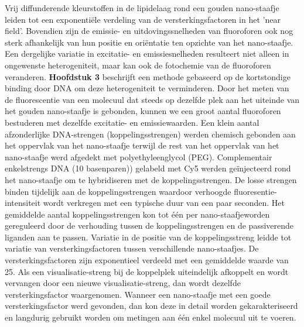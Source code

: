 Vrij diffunderende kleurstoffen in de lipidelaag rond een gouden nano-staafje leiden tot een exponentiële verdeling van de versterkingsfactoren in het ’near field’. Bovendien zijn de emissie- en uitdovingssnelheden van fluoroforen ook nog sterk afhankelijk van hun positie en oriëntatie ten opzichte van het nano-staafje. Een dergelijke variatie in excitatie- en emissiesnelheden resulteert niet alleen in ongewenste heterogeniteit, maar kan ook de fotochemie van de fluoroforen veranderen. \textbf{Hoofdstuk 3} beschrijft  een methode gebaseerd op de kortstondige binding door DNA om deze heterogeniteit te verminderen. Door het meten van de fluorescentie van een molecuul dat steeds op dezelfde plek aan het uiteinde van het gouden nano-staafje is gebonden, kunnen we een groot aantal fluoroforen bestuderen met dezelfde excitatie- en emissiewaarden. Een klein aantal afzonderlijke DNA-strengen (koppelingsstrengen) werden chemisch gebonden aan het oppervlak van het nano-staafje terwijl de rest van het oppervlak van het nano-staafje werd afgedekt met polyethyleenglycol (PEG). Complementair enkelstrengs DNA (10 basenparen)) gelabeld met Cy5 werden geïnjecteerd rond het nano-staafje om te hybridiseren met de koppelingsstrengen. De losse strengen binden tijdelijk aan de koppelingsstrengen waardoor verhoogde fluoresentie-intensiteit wordt verkregen met een typische duur van een paar seconden. Het gemiddelde aantal koppelingsstrengen kon tot één per nano-staafjeworden gereguleerd door de verhouding tussen de koppelingsstrengen en de passiverende liganden aan te passen. Variatie in de positie van de koppelingsstreng leidde tot variatie van versterkingsfactoren tussen verschillende nano-staafjes. De versterkingsfactoren zijn exponentieel verdeeld met een gemiddelde waarde van 25. Als een visualisatie-streng bij de koppelplek uiteindelijk afkoppelt en wordt vervangen door een nieuwe visualisatie-streng, dan wordt dezelfde versterkingsfactor waargenomen. Wanneer een nano-staafje met een goede versterkingsfactor werd gevonden, dan kon deze in detail worden gekarakteriseerd en langdurig gebruikt worden om metingen aan één enkel molecuul uit te voeren.


